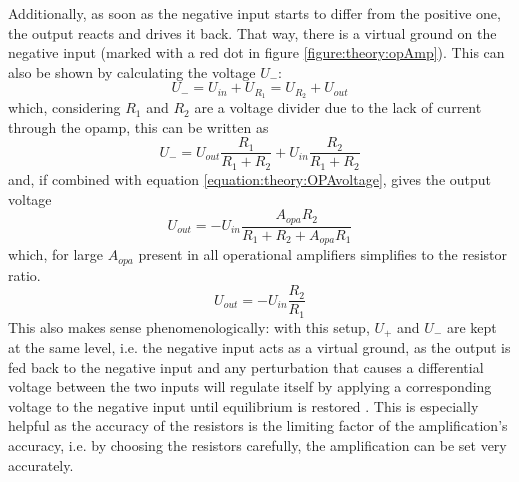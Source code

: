                Additionally, as soon as the negative input starts to differ from the positive one, the output reacts and drives it back. That way, there is a virtual ground on the negative input (marked with a red dot in figure \ref{figure:theory:opAmp}).
                This can also be shown by calculating the voltage $U_-$:
                \begin{equation}
                    U_- = U_{in} + U_{R_1} = U_{R_2} + U_{out}
                \end{equation}
                which, considering $R_1$ and $R_2$ are a voltage divider due to the lack of current through the opamp, this can be written as
                \begin{equation}
                    U_{-} = U_{out} \frac{R_1}{R_1+R_2} + U_{in} \frac{R_2}{R_1+R_2}
                \end{equation}
                and, if combined with equation \ref{equation:theory:OPAvoltage}, gives the output voltage
                \begin{equation}
                    U_{out} = -U_{in} \frac{A_{opa}R_2}{R_1+R_2 + A_{opa}R_1}
                \end{equation}
                which, for large $A_{opa}$ present in all operational amplifiers simplifies to the resistor ratio.
                \begin{equation}
                    U_{out} = -U_{in}\frac{R_2}{R_1}
                \end{equation}
                This also makes sense phenomenologically: with this setup, $U_{+}$ and $U_{-}$ are kept at the same level, i.e. the negative input acts as a virtual ground, as the output is fed back to the negative input and any perturbation that causes a differential voltage between the two inputs will regulate itself by applying a corresponding voltage to the negative input until equilibrium is restored \cite{huijsing_operational_2017-1}.
                This is especially helpful as the accuracy of the resistors is the limiting factor of the amplification's accuracy, i.e. by choosing the resistors carefully, the amplification can be set very accurately.
